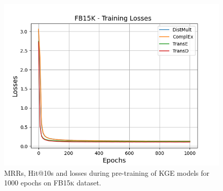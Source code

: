\begin{figure}[H]
\begin{minipage}{.3\textwidth}
      \includegraphics[width=\linewidth]{figures/results/pretrain/fb15k/pretrain_fb15k_losses.png}
    \end{minipage}%
    \caption{MRRs, Hit@10s and losses during pre-training of \ac{KGE} models for 1000 epochs on \textsc{FB15k} dataset.}
    \label{fig:pretraining}
\end{figure}


